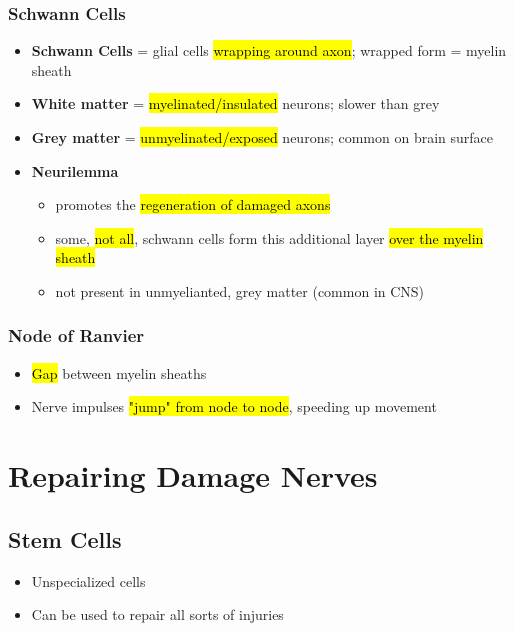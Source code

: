 \documentclass[a4paper,12pt]{article}
\begin{document}
\subsubsection{Schwann Cells}
\begin{itemize}
    \item{\textbf{Schwann Cells} = glial cells \hl{wrapping around axon}; wrapped form = myelin sheath}
    \item{\textbf{White matter} = \hl{myelinated/insulated} neurons; slower than grey}
    \item{\textbf{Grey matter} = \hl{unmyelinated/exposed} neurons; common on brain surface}
    \item{
            \textbf{Neurilemma}
            \begin{itemize}
                \item{promotes the \hl{regeneration of damaged axons}}
                \item{some, \hl{not all}, schwann cells form this additional layer \hl{over the myelin sheath}}
                \item{not present in unmyelianted, grey matter (common in CNS)}
            \end{itemize}
        }

\end{itemize}

\subsubsection{Node of Ranvier}
\begin{itemize}
    \item{\hl{Gap} between myelin sheaths}
    \item{Nerve impulses \hl{"jump" from node to node}, speeding up movement}
\end{itemize}

\section{Repairing Damage Nerves}
\subsection{Stem Cells}
\begin{itemize}
    \item{Unspecialized cells}
    \item{Can be used to repair all sorts of injuries}
\end{itemize}
\end{document}
